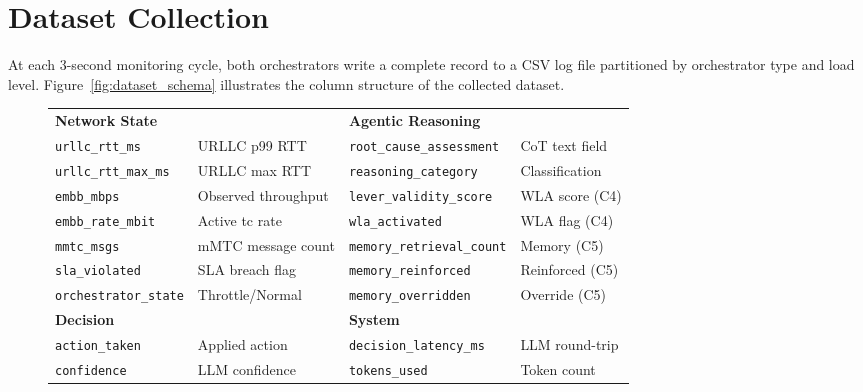 \section{Dataset Collection}

At each 3-second monitoring cycle, both orchestrators write a complete record to a
CSV log file partitioned by orchestrator type and load level.
Figure~\ref{fig:dataset_schema} illustrates the column structure of the collected
dataset.

\begin{figure}[H]
\centering
\begin{tcolorbox}[
  colback=gray!6, colframe=gray!40,
  title={\small\texttt{dataset\_agentic\_medium.csv} — Column Schema (6 datasets total)},
  fontupper=\ttfamily\scriptsize,
  left=4pt, right=4pt, top=4pt, bottom=4pt
]
\begin{tabular}{@{}ll@{\hspace{1.5cm}}ll@{}}
\multicolumn{2}{l}{\textbf{Network State}} & \multicolumn{2}{l}{\textbf{Agentic Reasoning}} \\
\texttt{urllc\_rtt\_ms}      & URLLC p99 RTT       & \texttt{root\_cause\_assessment} & CoT text field \\
\texttt{urllc\_rtt\_max\_ms} & URLLC max RTT       & \texttt{reasoning\_category}     & Classification \\
\texttt{embb\_mbps}          & Observed throughput & \texttt{lever\_validity\_score}  & WLA score (C4) \\
\texttt{embb\_rate\_mbit}    & Active tc rate      & \texttt{wla\_activated}          & WLA flag (C4)  \\
\texttt{mmtc\_msgs}          & mMTC message count  & \texttt{memory\_retrieval\_count}& Memory (C5) \\
\texttt{sla\_violated}       & SLA breach flag     & \texttt{memory\_reinforced}      & Reinforced (C5)\\
\texttt{orchestrator\_state} & Throttle/Normal     & \texttt{memory\_overridden}      & Override (C5) \\[4pt]
\multicolumn{2}{l}{\textbf{Decision}} & \multicolumn{2}{l}{\textbf{System}} \\
\texttt{action\_taken}       & Applied action      & \texttt{decision\_latency\_ms}   & LLM round-trip \\
\texttt{confidence}          & LLM confidence      & \texttt{tokens\_used}            & Token count \\

\end{tabular}
\end{tcolorbox}
\end{figure}

